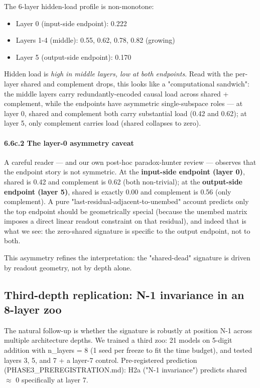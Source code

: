 The 6-layer hidden-load profile is non-monotone:

\begin{itemize}
  \item Layer 0 (input-side endpoint): 0.222
  \item Layers 1-4 (middle): 0.55, 0.62, 0.78, 0.82 (growing)
  \item Layer 5 (output-side endpoint): 0.170
\end{itemize}

Hidden load is \emph{high in middle layers, low at both endpoints}. Read
with the per-layer shared and complement drops, this looks like a
"computational sandwich": the middle layers carry redundantly-encoded
causal load across shared + complement, while the endpoints have
asymmetric single-subspace roles --- at layer 0, shared and complement
both carry substantial load (0.42 and 0.62); at layer 5, only
complement carries load (shared collapses to zero).

\paragraph{6.6c.2 The layer-0 asymmetry caveat}

A careful reader --- and our own post-hoc paradox-hunter review ---
observes that the endpoint story is not symmetric. At the \textbf{input-side endpoint (layer 0)}, shared is 0.42 and complement is 0.62 (both
non-trivial); at the \textbf{output-side endpoint (layer 5)}, shared is
exactly 0.00 and complement is 0.56 (only complement). A pure
"last-residual-adjacent-to-unembed" account predicts only the top
endpoint should be geometrically special (because the unembed matrix
imposes a direct linear readout constraint on that residual), and
indeed that is what we see: the zero-shared signature is specific to
the output endpoint, not to both.

This asymmetry refines the interpretation: the "shared-dead" signature
is driven by readout geometry, not by depth alone.

\subsection{Third-depth replication: N-1 invariance in an 8-layer zoo}

The natural follow-up is whether the signature is robustly at position
N-1 across multiple architecture depths. We trained a third zoo: 21
models on 5-digit addition with n\_layers = 8 (1 seed per freeze to
fit the time budget), and tested layers 3, 5, and 7 + a layer-7 control.
Pre-registered prediction (PHASE3\_PREREGISTRATION.md): H2a ("N-1
invariance") predicts shared $\approx$ 0 specifically at layer 7.

